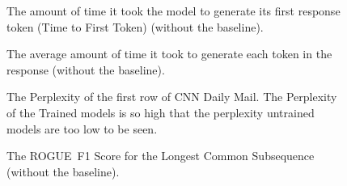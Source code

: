 \documentclass[
	title={Lottery Ticket Hypothesis for Large Language Models}
]{cs595project}
\newcommand{\ROUGE}{ROGUE}
\newcommand{\ablationunix}{1778204079} %
\providecommand{\ablationunix}{1778204079}
\begin{document}
\begin{figure}[H]
	\centering
	\resizebox{\textwidth}{!}{}
	\caption{The amount of time it took the model to generate its first response token (Time to First Token) (without the baseline).}
	\label{fig:ttft}
\end{figure}

\begin{figure}[H]
	\centering
	\resizebox{\textwidth}{!}{}
	\caption{The average amount of time it took to generate each token in the response (without the baseline).}
	\label{fig:tpot}
\end{figure}

\begin{figure}[H]
	\centering
	\resizebox{\textwidth}{!}{}
	\caption{The Perplexity of the first row of CNN Daily Mail. The Perplexity of the Trained models is so high that the perplexity untrained models are too low to be seen.}
	\label{fig:perplexity}
\end{figure}

\begin{figure}[H]
	\centering
	\resizebox{\textwidth}{!}{}
	\caption{The \ROUGE\ F1 Score for the Longest Common Subsequence (without the baseline).}
	\label{fig:rogue-l}
\end{figure}
\end{document}
